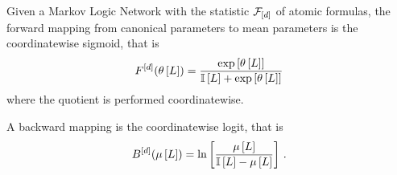 \begin{theorem}
	Given a Markov Logic Network with the statistic $\mathcal{F}_{[d]}$ of atomic formulas, the forward mapping from canonical parameters to mean parameters is the coordinatewise sigmoid, that is
		\[ F^{[d]}(\theta\left[L\right]) = \frac{\mathrm{exp}\left[\theta\left[L\right]\right]}{\mathbb{I}\left[L\right]+\mathrm{exp}\left[\theta\left[L\right]\right]}   \]
	where the quotient is performed coordinatewise.

	A backward mapping is the coordinatewise logit, that is
		\[ B^{[d]}(\mu\left[L\right]) 
		= \ln \left[ \frac{
			\mu\left[L\right]
			}{
			\mathbb{I}\left[L\right]-\mu\left[L\right]
			} \right]  \, . \]
\end{theorem}
